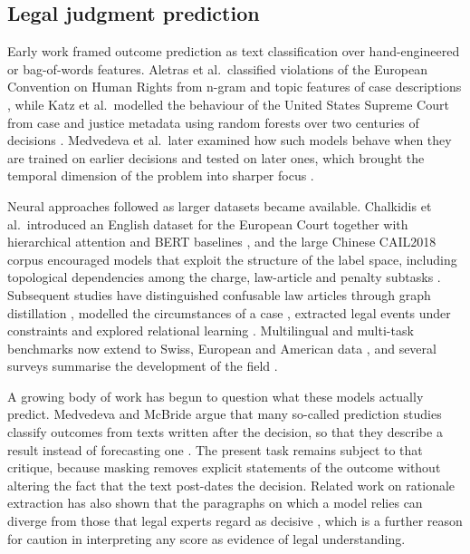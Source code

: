 \documentclass[journal]{IEEEtran}
\begin{document}
\subsection{Legal judgment prediction}
Early work framed outcome prediction as text classification over hand-engineered or bag-of-words features. Aletras et al.\ classified violations of the European Convention on Human Rights from n-gram and topic features of case descriptions \cite{r1}, while Katz et al.\ modelled the behaviour of the United States Supreme Court from case and justice metadata using random forests over two centuries of decisions \cite{r4}. Medvedeva et al.\ later examined how such models behave when they are trained on earlier decisions and tested on later ones, which brought the temporal dimension of the problem into sharper focus \cite{r2}.

Neural approaches followed as larger datasets became available. Chalkidis et al.\ introduced an English dataset for the European Court together with hierarchical attention and BERT baselines \cite{r3}, and the large Chinese CAIL2018 corpus \cite{r6} encouraged models that exploit the structure of the label space, including topological dependencies among the charge, law-article and penalty subtasks \cite{r5}. Subsequent studies have distinguished confusable law articles through graph distillation \cite{r15}, modelled the circumstances of a case \cite{r36}, extracted legal events under constraints \cite{r37} and explored relational learning \cite{r18}. Multilingual and multi-task benchmarks now extend to Swiss, European and American data \cite{r7,r38,r39}, and several surveys summarise the development of the field \cite{r8,r9}.

A growing body of work has begun to question what these models actually predict. Medvedeva and McBride argue that many so-called prediction studies classify outcomes from texts written after the decision, so that they describe a result instead of forecasting one \cite{r24}. The present task remains subject to that critique, because masking removes explicit statements of the outcome without altering the fact that the text post-dates the decision. Related work on rationale extraction has also shown that the paragraphs on which a model relies can diverge from those that legal experts regard as decisive \cite{r40}, which is a further reason for caution in interpreting any score as evidence of legal understanding.
\end{document}
